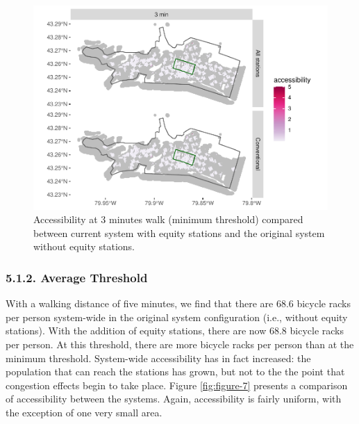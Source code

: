 \documentclass[]{elsarticle} %
\begin{document}
\begin{figure}

{\centering \includegraphics[width=0.9\linewidth]{Bike-share-spatial-equity_files/figure-latex/figure-6-1} 

}

\caption{Accessibility at 3 minutes walk (minimum threshold) compared between current system with equity stations and the original system without equity stations.}\label{fig:figure-6}
\end{figure}

\hypertarget{average-threshold}{%
\subsubsection{5.1.2. Average Threshold}\label{average-threshold}}

With a walking distance of five minutes, we find that there are 68.6
bicycle racks per person system-wide in the original system
configuration (i.e., without equity stations). With the addition of
equity stations, there are now 68.8 bicycle racks per person. At this
threshold, there are more bicycle racks per person than at the minimum
threshold. System-wide accessibility has in fact increased: the
population that can reach the stations has grown, but not to the the
point that congestion effects begin to take place. Figure
\ref{fig:figure-7} presents a comparison of accessibility between the
systems. Again, accessibility is fairly uniform, with the exception of
one very small area.
\end{document}
